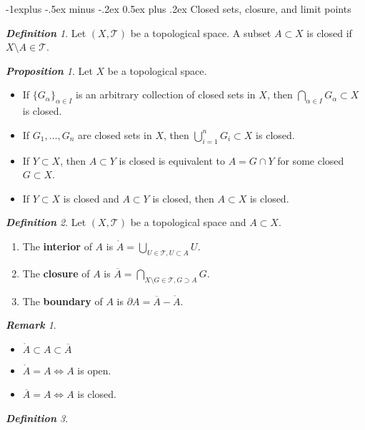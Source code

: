 \documentclass[frenchspacing,9pt,landscape,a4paper]{article}
\makeatletter
\renewcommand{\subsection}{\@startsection{subsection}{2}{0mm}%
                                {-1explus -.5ex minus -.2ex}%
                                {0.5ex plus .2ex}%
                                {\normalfont\normalsize\bfseries}}
\theoremstyle{remark}
\newtheorem*{defn}{\textbf{Definition}}
\newtheorem*{prop}{\textbf{Proposition}}
\newtheorem*{rem}{\textbf{Remark}}
\makeatother
\begin{document}
\begin{multicols}{4}
\subsection{Closed sets, closure, and limit points}
\begin{defn}
    Let $(X,\mathcal{T})$ be a topological space. A subset  $A\subset X$ is closed if  $X\setminus
    A\in\mathcal{T}$.
\end{defn}
\begin{prop}
    Let $X$ be a topological space.
     \begin{itemize}
         \item If $\{G_\alpha\}_{\alpha\in I}$ is an arbitrary collection of closed sets in  $X$, then
             $\bigcap_{\alpha\in I}G_\alpha\subset X$ is closed.
         \item If  $G_1,\dots,G_n$ are closed sets in $X$, then $\bigcup_{i=1}^n G_i\subset X$ is closed.
         \item If  $Y\subset X$, then  $A\subset Y$ is closed is equivalent to  $A=G\cap Y$ for some closed
              $G\subset X$.
         \item If $Y\subset X$ is closed and  $A\subset Y$ is closed, then  $A\subset X$ is closed.
    \end{itemize}
\end{prop}
\begin{defn}
    Let $(X,\mathcal{T})$ be a topological space and  $A\subset X$.
     \begin{enumerate}
         \item The \textbf{interior} of $A$ is  $\mathring{A}=\bigcup_{U\in\mathcal{T},U\subset A}U$.
         \item The \textbf{closure} of  $A$ is  $\overline{A}=\bigcap_{X\setminus
             G\in\mathcal{T},G\supset A}G$.
         \item The \textbf{boundary} of  $A$ is  $\partial A=\overline{A}-\mathring{A}$.
    \end{enumerate}
\end{defn}
\begin{rem}
     \begin{itemize}
         \item $\mathring{A}\subset A\subset\overline{A}$ 
         \item $\mathring{A}=A\iff A$ is open.
         \item  $\overline{A}=A\iff A$ is closed.
    \end{itemize}
\end{rem}
\begin{defn}

\end{defn}
\end{multicols}
\end{document}
